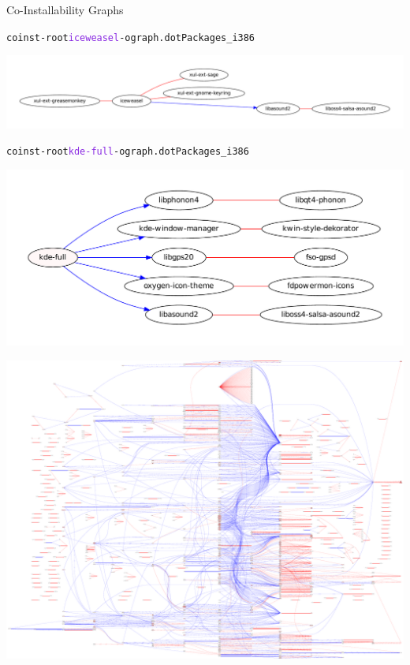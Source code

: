 \documentclass[xcolor={dvipsnames}]{beamer}
\newcommand{\EEE}[1]{\textcolor{BlueViolet}{#1}}
\begin{document}
\begin{frame}[fragile]{Co-Installability Graphs}
\begin{alltt}
coinst -root \EEE{iceweasel} -o graph.dot Packages_i386
\end{alltt}
\vspace{-2.5em}
\begin{center}
\includegraphics[width=\linewidth]{iceweasel.pdf}
\end{center}
\vspace{-2em}
\begin{alltt}
coinst -root \EEE{kde-full} -o graph.dot Packages_i386
\end{alltt}
\vspace{-2.5em}
\begin{center}
\includegraphics[width=0.65\linewidth]{kde-full.pdf}
\end{center}
\end{frame}

\begin{frame}
\begin{center}
\includegraphics[width=\linewidth]{flattened}
\end{center}
\end{frame}
\end{document}
